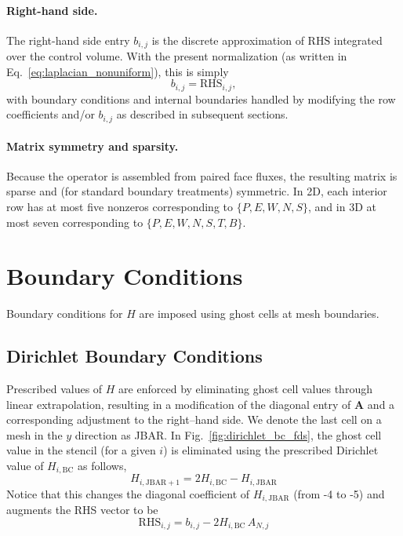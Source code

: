 \paragraph{Right-hand side.}
The right-hand side entry $b_{i,j}$ is the discrete approximation of $\mathrm{RHS}$ integrated over the control volume. With the present normalization (as written in Eq.~\eqref{eq:laplacian_nonuniform}), this is simply
\begin{equation}
b_{i,j} = \mathrm{RHS}_{i,j},
\label{eq:bij}
\end{equation}
with boundary conditions and internal boundaries handled by modifying the row coefficients and/or $b_{i,j}$ as described in subsequent sections.

\paragraph{Matrix symmetry and sparsity.}
Because the operator is assembled from paired face fluxes, the resulting matrix is sparse and (for standard boundary treatments) symmetric. In 2D, each interior row has at most five nonzeros corresponding to $\{P,E,W,N,S\}$, and in 3D at most seven corresponding to $\{P,E,W,N,S,T,B\}$.


\section{Boundary Conditions}

Boundary conditions for $H$ are imposed using ghost cells at mesh boundaries.

\subsection*{Dirichlet Boundary Conditions}

Prescribed values of $H$ are enforced by eliminating ghost cell values through linear extrapolation, resulting in a modification of the diagonal entry of $\mathbf{A}$ and a corresponding adjustment to the right--hand side.  We denote the last cell on a mesh in the $y$ direction as JBAR.  In Fig.~\ref{fig:dirichlet_bc_fds}, the ghost cell value in the stencil (for a given $i$) is eliminated using the prescribed Dirichlet value of $H_{i,\mathrm{BC}}$ as follows,
\begin{equation}
H_{i,\mathrm{JBAR}+1} = 2 H_{i,\mathrm{BC}} - H_{i,\mathrm{JBAR}}
\end{equation}
Notice that this changes the diagonal coefficient of $H_{i,\mathrm{JBAR}}$ (from -4 to -5) and augments the RHS vector to be
\begin{equation}
\mathrm{RHS}_{i,j} = b_{i,j} - 2 H_{i,\mathrm{BC}} \,A_{N,j}
\end{equation}

